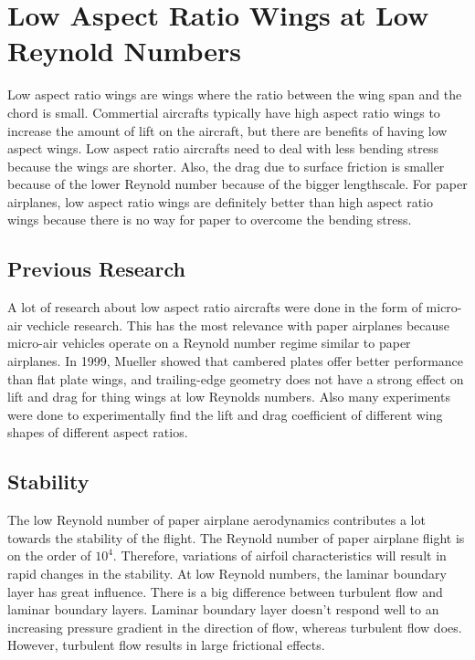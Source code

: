 
\chapter{Low Aspect Ratio Wings at Low Reynold Numbers}

Low aspect ratio wings are wings where the ratio between the wing span and
the chord is small. Commertial aircrafts typically have high aspect ratio wings
to increase the amount of lift on the aircraft, but there are benefits of having
low aspect wings. Low aspect ratio aircrafts need to deal with less bending
stress because the wings are shorter. Also, the drag due to surface friction is
smaller because of the lower Reynold number because of the bigger lengthscale.
For paper airplanes, low aspect ratio wings are definitely better than high
aspect ratio wings because there is no way for paper to overcome the
bending stress.


\section{Previous Research}

A lot of research about low aspect ratio aircrafts were done in the form of
micro-air vechicle research. This has the most relevance with paper airplanes because
micro-air vehicles operate on a Reynold number regime similar to paper airplanes. 
In 1999, Mueller showed that cambered plates offer better performance than flat plate wings, and
trailing-edge geometry does not have a strong effect on lift and drag
for thing wings at low Reynolds numbers. Also many experiments were done to experimentally
find the lift and drag coefficient of different wing shapes of different aspect ratios.

\section{Stability}

The low Reynold number of paper airplane aerodynamics contributes a lot towards the
stability of the flight.
The Reynold number of paper airplane flight is on the order of $10^4$.
Therefore, variations of airfoil characteristics will result in rapid changes in 
the stability. At low Reynold numbers, the laminar boundary layer has great 
influence. There is a big difference between turbulent flow and laminar boundary
layers. Laminar boundary layer doesn't respond well to an increasing
pressure gradient in the direction of flow, whereas turbulent flow does.
However, turbulent flow results in large frictional effects.

